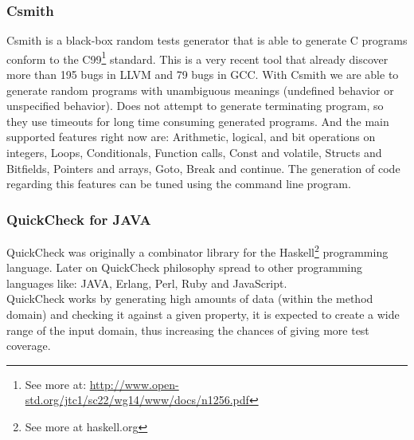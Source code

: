 \subsubsection{Csmith}
Csmith\cite{Yang:2011:FUB:1993316.1993532} is a black-box random tests generator that is able to generate C programs
conform to the C99\footnote{See more at: \url{http://www.open-std.org/jtc1/sc22/wg14/www/docs/n1256.pdf}} standard. This is a very recent tool that already discover
more than 195 bugs in LLVM and 79 bugs in GCC. With Csmith we are able to generate random programs with unambiguous meanings (undefined behavior or 
unspecified behavior). Does not attempt to generate terminating program, so they use timeouts for long time consuming generated programs.
And the main supported features right now are: Arithmetic, logical, and bit operations on integers, Loops, Conditionals, Function calls, Const and volatile,
Structs and Bitfields, Pointers and arrays, Goto, Break and continue. The generation of code regarding this features can be tuned using the command line program.

\subsubsection{QuickCheck for JAVA}
QuickCheck was originally a combinator library for the Haskell\footnote{See more at haskell.org} programming language\cite{Claessen:2000:QLT:357766.351266}.
Later on QuickCheck philosophy spread to other programming languages like: JAVA, Erlang, Perl, Ruby and JavaScript.\\
QuickCheck works by generating high amounts of data (within the method domain) and checking it against a given property,
it is expected to create a wide range of the input domain, thus increasing the chances of giving more test coverage.

